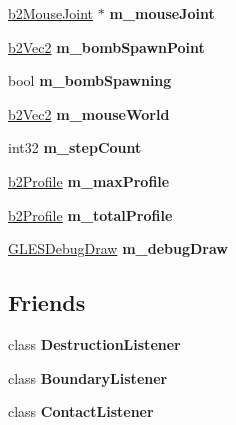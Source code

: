 \begin{DoxyCompactItemize}
\item 
\hypertarget{class_test_ac3cb348f24cfd35e467ca10ec9135ae2}{\hyperlink{classb2_mouse_joint}{b2\-Mouse\-Joint} $\ast$ {\bfseries m\-\_\-mouse\-Joint}}\label{class_test_ac3cb348f24cfd35e467ca10ec9135ae2}

\item 
\hypertarget{class_test_ad2dd7ba39707588ef5f1bc27b3d5425d}{\hyperlink{structb2_vec2}{b2\-Vec2} {\bfseries m\-\_\-bomb\-Spawn\-Point}}\label{class_test_ad2dd7ba39707588ef5f1bc27b3d5425d}

\item 
\hypertarget{class_test_a27320dd554f06608058fc17c63df3aef}{bool {\bfseries m\-\_\-bomb\-Spawning}}\label{class_test_a27320dd554f06608058fc17c63df3aef}

\item 
\hypertarget{class_test_a7c7cad34d65be96e3e0b5647cb1fb0b1}{\hyperlink{structb2_vec2}{b2\-Vec2} {\bfseries m\-\_\-mouse\-World}}\label{class_test_a7c7cad34d65be96e3e0b5647cb1fb0b1}

\item 
\hypertarget{class_test_aeba7befe157e2897d4f4cbae18cfe87a}{int32 {\bfseries m\-\_\-step\-Count}}\label{class_test_aeba7befe157e2897d4f4cbae18cfe87a}

\item 
\hypertarget{class_test_a62c3b995fdfb0cbdfb8443c5af0147d7}{\hyperlink{structb2_profile}{b2\-Profile} {\bfseries m\-\_\-max\-Profile}}\label{class_test_a62c3b995fdfb0cbdfb8443c5af0147d7}

\item 
\hypertarget{class_test_a620017b99e7e4d2d3ff17a89faebc00b}{\hyperlink{structb2_profile}{b2\-Profile} {\bfseries m\-\_\-total\-Profile}}\label{class_test_a620017b99e7e4d2d3ff17a89faebc00b}

\item 
\hypertarget{class_test_a74f787f8ffd3d54154d94ab9072c2761}{\hyperlink{class_g_l_e_s_debug_draw}{G\-L\-E\-S\-Debug\-Draw} {\bfseries m\-\_\-debug\-Draw}}\label{class_test_a74f787f8ffd3d54154d94ab9072c2761}

\end{DoxyCompactItemize}
\subsection*{Friends}
\begin{DoxyCompactItemize}
\item 
\hypertarget{class_test_a5f8564c293b66e23a676a9cb34d213ab}{class {\bfseries Destruction\-Listener}}\label{class_test_a5f8564c293b66e23a676a9cb34d213ab}

\item 
\hypertarget{class_test_a6d7b1865bf55893d6857c99289d2d2fb}{class {\bfseries Boundary\-Listener}}\label{class_test_a6d7b1865bf55893d6857c99289d2d2fb}

\item 
\hypertarget{class_test_a892fff95139a3bb02ec8e9ff2101f23a}{class {\bfseries Contact\-Listener}}\label{class_test_a892fff95139a3bb02ec8e9ff2101f23a}

\end{DoxyCompactItemize}


